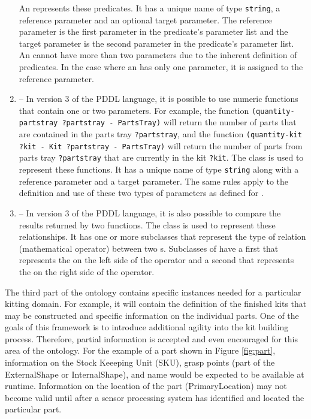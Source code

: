 \begin{enumerate}
An  represents these predicates. It has a unique name of type \texttt{string}, a reference parameter and an optional target parameter. The reference parameter is the first parameter in the predicate's parameter list and the target parameter is the second parameter in the predicate's parameter list. An  cannot have more than two parameters due to the inherent definition of predicates. In the case where an  has only one parameter, it is assigned to the reference parameter. 
%
\item {} -- In version 3 of the PDDL language, it is possible to use numeric functions that contain one or two parameters. For example, the function \texttt{(quantity-partstray ?partstray - PartsTray)} will return the number of parts that are contained in the parts tray \texttt{?partstray}, and the function
\texttt{(quantity-kit ?kit - Kit ?partstray - PartsTray)} will return the number of parts from parts tray \texttt{?partstray} that are currently in the kit \texttt{?kit}. The class  is used to represent these functions. It has a unique name  of type \texttt{string} along with a reference parameter and a target parameter. The same rules apply to the definition and use of these two types of parameters as defined for .
%
\item {} -- In version 3 of the PDDL language, it is also possible to compare the results returned by two functions. The class  is used to represent these relationships. It has one or more subclasses that represent the type of relation (mathematical operator) between two s. Subclasses of  have a first  that represents the  on the left side of the operator and a second  that represents the  on the right side of the operator.
\end{enumerate}

The third part of the ontology contains specific instances needed for a particular kitting domain. For example, it will contain the definition of the finished kits that may be
constructed and specific information on the individual parts. One of the goals of this framework is to introduce additional agility into the kit building process. Therefore,
partial information is accepted and even encouraged for this area of the ontology. For the example of a part shown in Figure \ref{fig:part}, information on the Stock Keeeping Unit (SKU), grasp points 
(part of the ExternalShape or InternalShape), and name would be expected to be available at runtime. Information on the location of the part (PrimaryLocation) may not
become valid until after a sensor processing system has identified and located the particular part.
%
